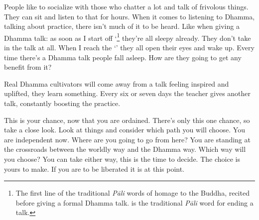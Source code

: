 People like to socialize with those who chatter a lot and talk of frivolous things. They can sit and listen to that for hours. When it comes to listening to Dhamma, talking about practice, there isn't much of it to be heard. Like when giving a Dhamma talk: as soon as I start off `\footnote{The first line of the traditional \textit{P\=ali} words of homage to the Buddha, recited before giving a formal Dhamma talk.  is the traditional \textit{P\=ali} word for ending a talk.} they're all sleepy already. They don't take in the talk at all. When I reach the `' they all open their eyes and wake up. Every time there's a Dhamma talk people fall asleep. How are they going to get any benefit from it? 

Real Dhamma cultivators will come away from a talk feeling inspired and uplifted, they learn something. Every six or seven days the teacher gives another talk, constantly boosting the practice. 

This is your chance, now that you are ordained. There's only this one chance, so take a close look. Look at things and consider which path you will choose. You are independent now. Where are you going to go from here? You are standing at the crossroads between the worldly way and the Dhamma way. Which way will you choose? You can take either way, this is the time to decide. The choice is yours to make. If you are to be liberated it is at this point. 

